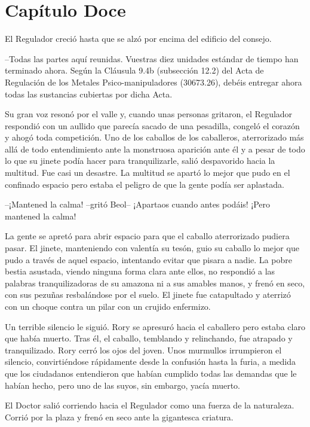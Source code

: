 \chapter*{Capítulo Doce}

{El Regulador creció hasta que se alzó por encima del edificio del
consejo.}

{--Todas las partes aquí reunidas. Vuestras diez unidades estándar de
	tiempo han terminado ahora. Según la Cláusula 9.4b (subsección 12.2) del
	Acta de Regulación de los Metales Psico-manipuladores (30673.26), debéis
entregar ahora todas las sustancias cubiertas por dicha Acta.}

{Su gran voz resonó por el valle y, cuando unas personas gritaron, el
	Regulador respondió con un aullido que parecía sacado de una pesadilla,
	congeló el corazón y ahogó toda competición. Uno de los caballos de los
	caballeros, aterrorizado más allá de todo entendimiento ante la
	monstruosa aparición ante él y a pesar de todo lo que su jinete podía
	hacer para tranquilizarle, salió despavorido hacia la multitud. Fue casi
	un desastre. La multitud se apartó lo mejor que pudo en el confinado
espacio pero estaba el peligro de que la gente podía ser aplastada.}

{--¡Mantened la calma! --gritó Beol-- ¡Apartaos cuando antes podáis!
¡Pero mantened la calma!}

{La gente se apretó para abrir espacio para que el caballo aterrorizado
	pudiera pasar. El jinete, manteniendo con valentía su tesón, guio su
	caballo lo mejor que pudo a través de aquel espacio, intentando evitar
	que pisara a nadie. La pobre bestia asustada, viendo ninguna forma clara
	ante ellos, no respondió a las palabras tranquilizadoras de su amazona
	ni a sus amables manos, y frenó en seco, con sus pezuñas resbalándose
	por el suelo. El jinete fue catapultado y aterrizó con un choque contra
un pilar con un crujido enfermizo.}

{Un terrible silencio le siguió. Rory se apresuró hacia el caballero
	pero estaba claro que había muerto. Tras él, el caballo, temblando y
	relinchando, fue atrapado y tranquilizado. Rory cerró los ojos del
	joven. Unos murmullos irrumpieron el silencio, convirtiéndose
	rápidamente desde la confusión hasta la furia, a medida que los
	ciudadanos entendieron que habían cumplido todas las demandas que le
habían hecho, pero uno de las suyos, sin embargo, yacía muerto.}

{El Doctor salió corriendo hacia el Regulador como una fuerza de la
	naturaleza. Corrió por la plaza y frenó en seco ante la gigantesca
criatura.}

